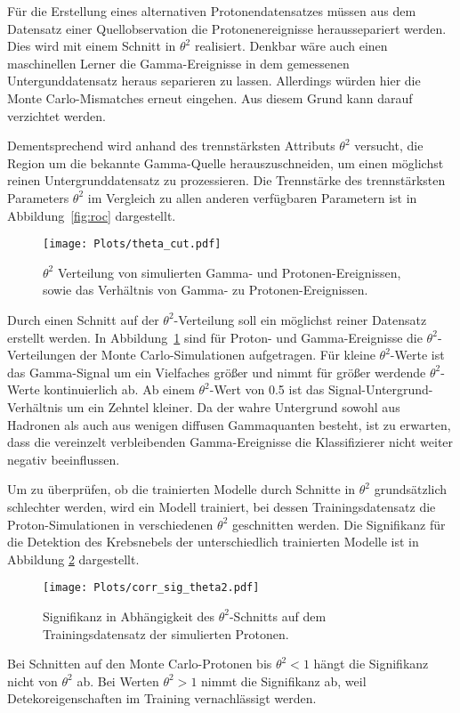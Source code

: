 Für die Erstellung eines alternativen Protonendatensatzes müssen aus dem Datensatz einer Quellobservation die Protonenereignisse heraussepariert werden. 
Dies wird mit einem Schnitt in $\theta^{2}$ realisiert.
Denkbar wäre auch einen maschinellen Lerner die Gamma-Ereignisse in dem gemessenen Untergunddatensatz heraus separieren zu lassen.
Allerdings würden hier die Monte Carlo-Mismatches erneut eingehen. 
Aus diesem Grund kann darauf verzichtet werden.

Dementsprechend wird anhand des trennstärksten Attributs $\theta^{2}$ versucht, die Region um die bekannte Gamma-Quelle herauszuschneiden, um einen möglichst reinen Untergrunddatensatz zu prozessieren. 
Die Trennstärke des trennstärksten Parameters $\theta^{2}$ im Vergleich zu allen anderen verfügbaren Parametern ist in Abbildung~\ref{fig:roc} dargestellt. 
\begin{figure}[H]
  \centering
  \texttt{[image: Plots/theta\_cut.pdf]}
  \caption{$\theta^{2}$ Verteilung von simulierten Gamma- und Protonen-Ereignissen, sowie das Verhältnis von Gamma- zu Protonen-Ereignissen.}
  \label{fig:thetacut}
\end{figure}
Durch einen Schnitt auf der $\theta^{2}$-Verteilung soll ein möglichst reiner Datensatz erstellt werden. 
In Abbildung~\ref{fig:thetacut} sind für Proton- und Gamma-Ereignisse die $\theta^{2}$-Verteilungen der Monte Carlo-Simulationen aufgetragen. 
Für kleine $\theta^{2}$-Werte ist das Gamma-Signal um ein Vielfaches größer und nimmt für größer werdende $\theta^{2}$-Werte kontinuierlich ab. 
Ab einem $\theta^{2}$-Wert von \num{0.5} ist das Signal-Untergrund-Verhältnis um ein Zehntel kleiner.
Da der wahre Untergrund sowohl aus Hadronen als auch aus wenigen diffusen Gammaquanten besteht, ist zu erwarten, dass die vereinzelt verbleibenden Gamma-Ereignisse die Klassifizierer nicht weiter negativ beeinflussen.

Um zu überprüfen, ob die trainierten Modelle durch Schnitte in $\theta^{2}$ grundsätzlich schlechter werden, wird ein Modell trainiert, bei dessen Trainingsdatensatz die Proton-Simulationen in verschiedenen $\theta^{2}$ geschnitten werden. 
Die Signifikanz für die Detektion des Krebsnebels der unterschiedlich trainierten Modelle ist in Abbildung \ref{fig:corrtheta} dargestellt.
\begin{figure}[H]
  \centering
  \texttt{[image: Plots/corr\_sig\_theta2.pdf]}
  \caption{Signifikanz in Abhängigkeit des $\theta^{2}$-Schnitts auf dem Trainingsdatensatz der simulierten Protonen.}
  \label{fig:corrtheta}
\end{figure}
Bei Schnitten auf den Monte Carlo-Protonen bis $\theta^{2} < 1$ hängt die Signifikanz nicht von $\theta^{2}$ ab.
Bei Werten $\theta^{2} > 1$ nimmt die Signifikanz ab, weil Detekoreigenschaften im Training vernachlässigt werden.

